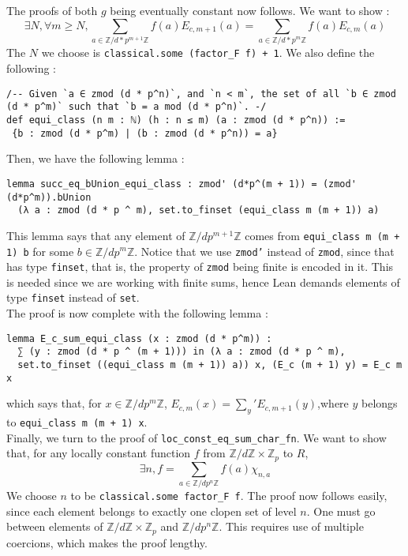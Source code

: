 \documentclass[11pt]{article}
\newcommand{\lean}[1]{\texttt{#1}\xspace} %
\begin{document}
The proofs of both $g$ being eventually constant now follows. We want to show : 
$$ \exists N, \forall m \ge N, \sum_{a \in \mathbb{Z}/d*p^{m + 1} \mathbb{Z}} f(a) E_{c,m + 1}(a) = \sum_{a \in \mathbb{Z}/d*p^{m} \mathbb{Z}} f(a) E_{c,m}(a) $$
The $N$ we choose is \lean{classical.some (factor\_F f) + 1}. We also define the following : 
\begin{lstlisting}
/-- Given `a ∈ zmod (d * p^n)`, and `n < m`, the set of all `b ∈ zmod (d * p^m)` such that `b = a mod (d * p^n)`. -/
def equi_class (n m : ℕ) (h : n ≤ m) (a : zmod (d * p^n)) :=
 {b : zmod (d * p^m) | (b : zmod (d * p^n)) = a}
\end{lstlisting}
Then, we have the following lemma :
\begin{lstlisting}
lemma succ_eq_bUnion_equi_class : zmod' (d*p^(m + 1)) = (zmod' (d*p^m)).bUnion
  (λ a : zmod (d * p ^ m), set.to_finset (equi_class m (m + 1)) a) 
\end{lstlisting}
This lemma says that any element of $\mathbb{Z}/dp^{m + 1} \mathbb{Z}$ comes from \lean{equi\_class m (m + 1) b} for some $b \in \mathbb{Z}/dp^m \mathbb{Z}$. 
Notice that we use \lean{zmod'} instead of \lean{zmod}, since that has type \lean{finset}, that is, the property of \lean{zmod} being finite is encoded in it. This 
is needed since we are working with finite sums, hence Lean demands elements of type \lean{finset} instead of \lean{set}. \\

The proof is now complete with the following lemma :
\begin{lstlisting}
lemma E_c_sum_equi_class (x : zmod (d * p^m)) :
  ∑ (y : zmod (d * p ^ (m + 1))) in (λ a : zmod (d * p ^ m), 
  set.to_finset ((equi_class m (m + 1)) a)) x, (E_c (m + 1) y) = E_c m x
\end{lstlisting}
which says that, for $x \in \mathbb{Z}/dp^m \mathbb{Z}$, $E_{c, m} (x) = \sum_{y}' E_{c, m + 1} (y)$,\newline where $y$ belongs to \lean{equi\_class m (m + 1) x}. \\

Finally, we turn to the proof of \lean{loc\_const\_eq\_sum\_char\_fn}. We want to show that, for any locally constant function $f$ from 
$\mathbb{Z}/d \mathbb{Z} \times \mathbb{Z}_p$ to $R$, 
$$\exists n, f = \sum_{a \in \mathbb{Z}/dp^n \mathbb{Z}} f(a) \chi_{n, a}$$
We choose $n$ to be \lean{classical.some factor\_F f}. The proof now follows easily, since each element belongs to exactly one clopen set of level $n$. One must go 
between elements of $\mathbb{Z}/d \mathbb{Z} \times \mathbb{Z}_p$ and $\mathbb{Z}/dp^n \mathbb{Z}$. This requires use of multiple coercions, which makes the proof lengthy. \\
\end{document}
